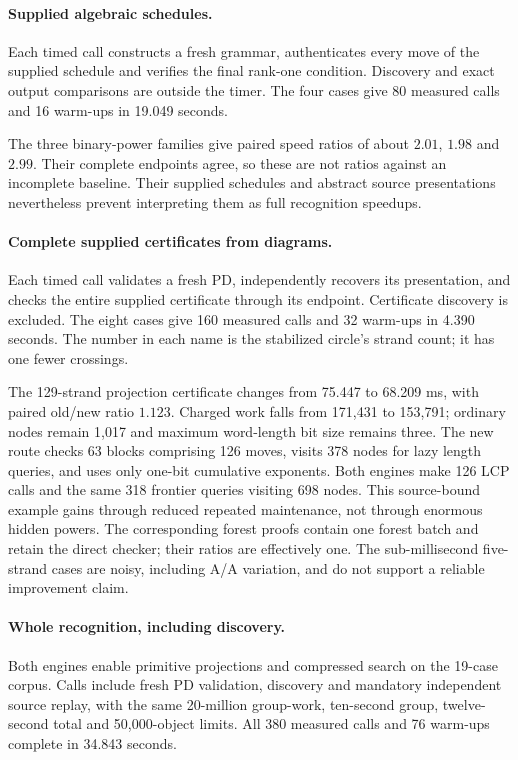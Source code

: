 \paragraph{Supplied algebraic schedules.}
Each timed call constructs a fresh grammar, authenticates every move of the
supplied schedule and verifies the final rank-one condition. Discovery and
exact output comparisons are outside the timer. The four cases give 80
measured calls and 16 warm-ups in 19.049 seconds.



The three binary-power families give paired speed ratios of about $2.01$,
$1.98$ and $2.99$. Their complete endpoints agree, so these are not ratios
against an incomplete baseline. Their supplied schedules and abstract source
presentations nevertheless prevent interpreting them as full recognition
speedups.

\paragraph{Complete supplied certificates from diagrams.}
Each timed call validates a fresh PD, independently recovers its presentation,
and checks the entire supplied certificate through its endpoint. Certificate
discovery is excluded. The eight cases give 160 measured calls and 32 warm-ups
in 4.390 seconds. The number in each name is the stabilized circle's strand
count; it has one fewer crossings.



The 129-strand projection certificate changes from 75.447 to 68.209 ms,
with paired old/new ratio $1.123$. Charged work falls from 171,431 to 153,791;
ordinary nodes remain 1,017 and maximum word-length bit size remains three.
The new route checks 63 blocks comprising 126 moves, visits 378 nodes for
lazy length queries, and uses only one-bit cumulative exponents. Both
engines make 126 LCP calls and the same 318 frontier queries visiting 698
nodes. This source-bound example gains through reduced repeated maintenance,
not through enormous hidden powers. The corresponding forest proofs contain
one forest batch and retain the direct checker; their ratios are effectively
one. The sub-millisecond five-strand cases are noisy, including A/A variation,
and do not support a reliable improvement claim.

\paragraph{Whole recognition, including discovery.}
Both engines enable primitive projections and compressed search on the
19-case corpus. Calls include fresh PD validation, discovery and mandatory
independent source replay, with the same 20-million group-work, ten-second
group, twelve-second total and 50,000-object limits. All 380 measured calls
and 76 warm-ups complete in 34.843 seconds.

